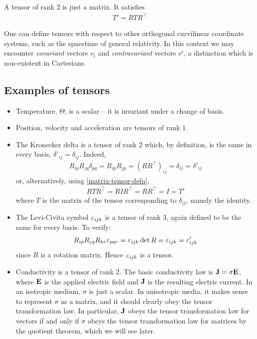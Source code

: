 \documentclass{../template/note}
\begin{document}
    \begin{proposition}
        \label{matrix-tensor-defn}
        A tensor of rank 2 is just a matrix. It satisfies
        \begin{align*}
            T' = RTR^\intercal 
        \end{align*}
    \end{proposition}
    
    \begin{remark*}
        One can define tensors with respect to other orthogonal curvilinear coordinate systems, such as the spacetime of general relativity. In this context we may encounter \emph{covariant} vectors \(v_i\) and \emph{contravariant} vectors \(v^i\), a distinction which is non-existent in Cartesians.
    \end{remark*}
    
    \subsection{Examples of tensors}

    \begin{itemize}
        \item Temperature, \(\Theta\), is a scalar -- it is invariant under a change of basis.
        \item Position, velocity and acceleration are tensors of rank 1.
        \item The Kronecker delta is a tensor of rank 2 which, by definition, is the same in every basis, \(\delta'_{ij} = \delta_{ij}\). Indeed,
        \begin{align*}
            R_{ip} R_{jq} \delta_{pq} = R_{ip} R_{jp} = (RR^\intercal)_{ij} = \delta_{ij} = \delta'_{ij}
        \end{align*}
        or, alternatively, using \cref{matrix-tensor-defn},
        \begin{align*}
            RTR^\intercal = RIR^\intercal = RR^\intercal = I = T'
        \end{align*}
        where \(T\) is the matrix of the tensor corresponding to \(\delta_{ij}\), namely the identity.
        \item The Levi-Civita symbol \(\varepsilon_{ijk}\) is a tensor of rank 3, again defined to be the same for every basis. To verify:
        \begin{align*}
            R_{ip}R_{jq}R_{kr}\varepsilon_{pqr} = \varepsilon_{ijk} \det R = \varepsilon_{ijk} = \varepsilon'_{ijk}
        \end{align*}
        since \(R\) is a rotation matrix. Hence \(\varepsilon_{ijk}\) is a tensor.
        \item Conductivity is a tensor of rank 2. The basic conductivity law is \(\V J = \sigma \V E\), where \(\V E\) is the applied electric field and \(\V J\) is the resulting electric current. In an isotropic medium, \(\sigma\) is just a scalar. In anisotropic media, it makes sense to represent \(\sigma\) as a matrix, and it should clearly obey the tensor transformation law. In particular, \(\V J\) obeys the tensor transformation law for vectors if and only if \(\sigma\) obeys the tensor transformation law for matrices by the quotient theorem, which we will see later.
    \end{itemize}
    
\end{document}
